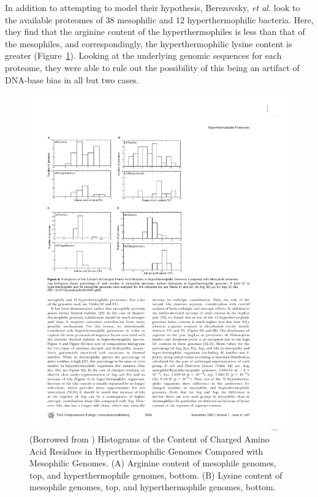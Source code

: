In addition to attempting to model their hypothesis, Berezovsky, \emph{et al.} look to the available proteomes of 38 mesophilic and 12 hyperthermophilic bacteria. Here, they find that the arginine content of the hyperthermophiles is less than that of the mesophiles, and correspondingly, the hyperthermophilic lysine content is greater (Figure~\ref{fig:aa_content}). Looking at the underlying genomic sequences for each proteome, they were able to rule out the possibility of this being an artifact of DNA-base bias in all but two cases.

\begin{figure}[h]
	\center
	\includegraphics{aa_content}
	\caption{(Borrowed from \cite{Berezovsky:2005p40}) Histograms of the Content of Charged Amino Acid Residues in Hyperthermophilic Genomes Compared with Mesophilic Genomes. (A) Arginine content of mesophile genomes, top, and hyperthermophile genomes, bottom. (B) Lysine content of mesophile genomes, top, and hyperthermophile genomes, bottom. }
	\label{fig:aa_content}
\end{figure}

